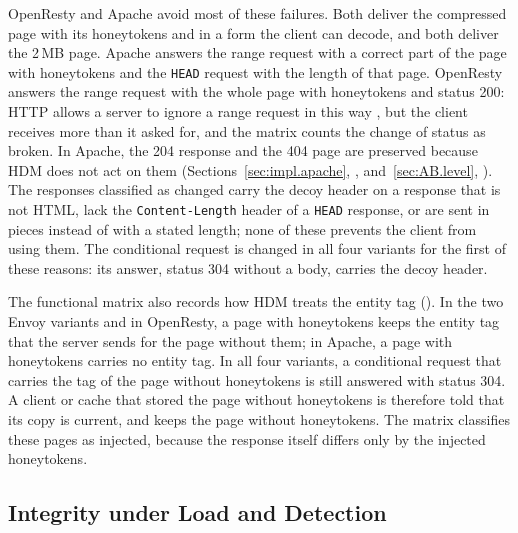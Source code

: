 \documentclass{rptuma}
\begin{document}
OpenResty and Apache avoid most of these failures. Both deliver the compressed page with its
honeytokens and in a form the client can decode, and both deliver the 2\,MB page. Apache answers the range request with a correct part of the page with honeytokens and the
\texttt{HEAD} request with the length of that page. OpenResty answers the range request
with the whole page with honeytokens and status 200: HTTP allows a server to ignore a range request
in this way \cite{rfc9110}, but the client receives more than it asked for, and the matrix counts
the change of status as broken. In Apache, the 204 response and the 404 page are
preserved because HDM does not act on them (Sections~\ref{sec:impl.apache}, \emph{}, and~\ref{sec:AB.level}, \emph{}).
The responses classified as changed carry the decoy header on a response that is not HTML, lack the
\texttt{Content-Length} header of a \texttt{HEAD} response, or are sent in pieces instead of with a
stated length; none of these prevents the client from using them. The conditional request is
changed in all four variants for the first of these reasons: its answer, status 304 without a
body, carries the decoy header.

The functional matrix also records how HDM treats the entity tag (). In the
two Envoy variants and in OpenResty, a page with honeytokens keeps the entity tag that the server
sends for the page without them; in Apache, a page with honeytokens carries no entity tag. In all
four variants, a conditional request that carries the tag of the page without honeytokens is still
answered with status 304. A client or cache that stored the page without honeytokens is therefore
told that its copy is current, and keeps the page without honeytokens. The matrix classifies these
pages as injected, because the response itself differs only by the injected honeytokens.

\subsection{Integrity under Load and Detection}
\label{sec:results.integrity}
\end{document}
